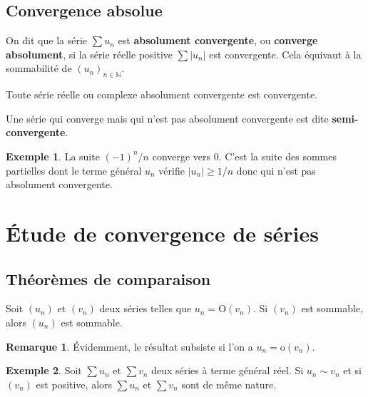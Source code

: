 \documentclass[french]{article}
\newcommand{\N}{\mathbb{N}}
\renewcommand{\o}{\text{o}}
\renewcommand{\O}{\text{O}}
\theoremstyle{plain}
\theoremstyle{definition}
\newtheorem*{ex}{Exemple}
\newtheorem*{rmq}{Remarque}
\theoremstyle{remark}
\begin{document}
\subsection{Convergence absolue}

\begin{dfn}
	On dit que la série $\displaystyle\sum u_n$ est \textbf{absolument convergente}, ou \textbf{converge absolument}, si la série réelle positive $\displaystyle\sum \lvert u_n\rvert$ est convergente. Cela équivaut à la sommabilité de $(u_n)_{n\in\N}$.
\end{dfn}

\begin{thm}
	Toute série réelle ou complexe absolument convergente est convergente.
\end{thm}

\begin{dfn}
	Une série qui converge mais qui n'est pas absolument convergente est dite \textbf{semi-convergente}.
\end{dfn}

\begin{ex}
	La suite $(-1)^n/n$ converge vers $0$. C'est la suite des sommes partielles dont le terme général $u_n$ vérifie $\lvert u_n\rvert\geqslant1/n$ donc qui n'est pas absolument convergente.
\end{ex}

\section{Étude de convergence de séries}

\subsection{Théorèmes de comparaison}

\begin{prop}%
	Soit $(u_n)$ et $(v_n)$ deux séries telles que $u_n=\O(v_n)$. Si $(v_n)$ est sommable, alors $(u_n)$ est sommable.
\end{prop}

\begin{rmq}
	Évidemment, le résultat subsiste si l'on a $u_n=\o(v_n)$.
\end{rmq}

\begin{ex}
	Soit $\displaystyle\sum u_n$ et $\displaystyle\sum v_n$ deux séries à terme général réel. Si $u_n\sim v_n$ et si $(v_n)$ est positive, alors $\displaystyle\sum u_n$ et $\displaystyle\sum v_n$ sont de même nature.
\end{ex}
\end{document}
